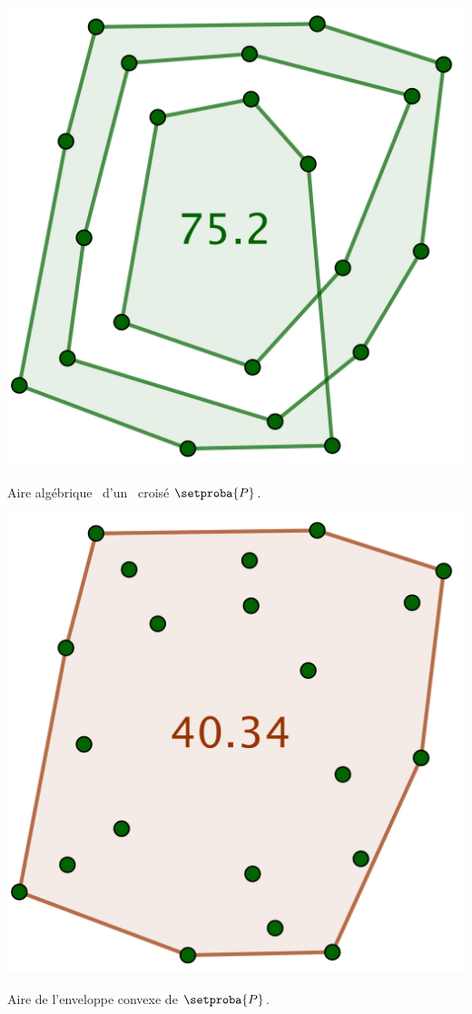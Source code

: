 \begin{multicols}{2}
	\centering\small\itshape

	\includegraphics[scale=.35]{content/polygon/at-least-one/algarea-badforus-1.png}

    \smallskip

	Aire \og algébrique \fg\ d'un \ngone\ croisé $\setproba{P}$.

	\columnbreak

    \includegraphics[scale=.35]{content/polygon/at-least-one/algarea-badforus-2.png}

   	\smallskip

	Aire de l'enveloppe convexe de $\setproba{P}$.
\end{multicols}

